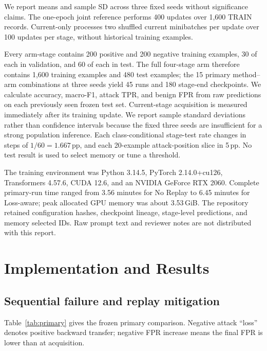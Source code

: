 \documentclass[conference]{IEEEtran}
\newcommand{\pp}{\,\mathrm{pp}}
\begin{document}
We report means and sample SD across three fixed seeds without significance claims. The one-epoch joint reference performs 400 updates over 1,600 TRAIN records. Current-only processes two shuffled current minibatches per update over 100 updates per stage, without historical training examples.

Every arm-stage contains 200 positive and 200 negative training examples, 30 of each in validation, and 60 of each in test. The full four-stage arm therefore contains 1,600 training examples and 480 test examples; the 15 primary method--arm combinations at three seeds yield 45 runs and 180 stage-end checkpoints. We calculate accuracy, macro-F1, attack TPR, and benign FPR from raw predictions on each previously seen frozen test set. Current-stage acquisition is measured immediately after its training update. We report sample standard deviations rather than confidence intervals because the fixed three seeds are insufficient for a strong population inference. Each class-conditional stage-test rate changes in steps of $1/60=1.667\pp$, and each 20-example attack-position slice in 5\,pp. No test result is used to select memory or tune a threshold.

The training environment was Python 3.14.5, PyTorch 2.14.0+cu126, Transformers 4.57.6, CUDA 12.6, and an NVIDIA GeForce RTX 2060. Complete primary-run time ranged from 3.56 minutes for No Replay to 6.45 minutes for Loss-aware; peak allocated GPU memory was about 3.53\,GiB. The repository retained configuration hashes, checkpoint lineage, stage-level predictions, and memory selected IDs. Raw prompt text and reviewer notes are not distributed with this report.

\section{Implementation and Results}
\subsection{Sequential failure and replay mitigation}

Table~\ref{tab:primary} gives the frozen primary comparison. Negative attack ``loss'' denotes positive backward transfer; negative FPR increase means the final FPR is lower than at acquisition.
\end{document}
